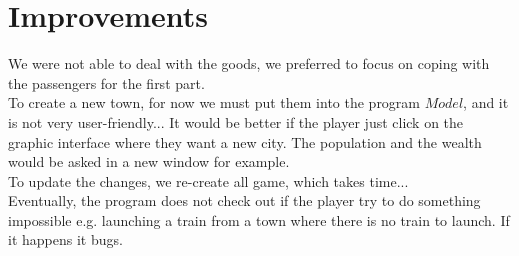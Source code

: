 \documentclass[a4paper]{article}
\begin{document}
	\section{Improvements}
	We were not able to deal with the goods, we preferred to focus on coping with the passengers for the first part.\\
	To create a new town, for now we must put them into the program $Model$, and it is not very user-friendly... It would be better if the player just click on the graphic interface where they want a new city. The population and the wealth would be asked in a new window for example.\\
	To update the changes, we re-create all game, which takes time...\\
	Eventually, the program does not check out if the player try to do something impossible e.g. launching a train from a town where there is no train to launch. If it happens it bugs.  
	
\end{document}
